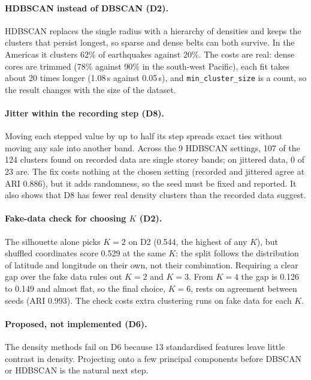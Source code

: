\paragraph{HDBSCAN instead of DBSCAN (D2).} HDBSCAN replaces the single radius with a hierarchy of
densities and keeps the clusters that persist longest, so sparse and dense belts can both survive. In the
Americas it clusters 62\% of earthquakes against 20\%. The costs are real: dense cores are trimmed (78\%
against 90\% in the south-west Pacific), each fit takes about 20 times longer (1.08\,s against 0.05\,s),
and \texttt{min\_cluster\_size} is a count, so the result changes with the size of the dataset.

\paragraph{Jitter within the recording step (D8).} Moving each stepped value by up to half its step
spreads exact ties without moving any sale into another band. Across the 9 HDBSCAN settings, 107 of the
124 clusters found on recorded data are single storey bands; on jittered data, 0 of 23 are. The fix costs
nothing at the chosen setting (recorded and jittered agree at ARI 0.886), but it adds randomness, so the
seed must be fixed and reported. It also shows that D8 has fewer real density clusters than the recorded
data suggest.

\paragraph{Fake-data check for choosing $K$ (D2).} The silhouette alone picks $K=2$ on D2 (0.544, the
highest of any $K$), but shuffled coordinates score 0.529 at the same $K$: the split follows the
distribution of latitude and longitude on their own, not their combination. Requiring a clear gap over the
fake data rules out $K=2$ and $K=3$. From $K=4$ the gap is 0.126 to 0.149 and almost flat, so the final
choice, $K=6$, rests on agreement between seeds (ARI 0.993). The check costs extra clustering runs on fake
data for each $K$.
\habegin
\paragraph{Proposed, not implemented (D6).} \hatag{} The density methods fail on D6 because 13
standardised features leave little contrast in density. Projecting onto a few principal components
before DBSCAN or HDBSCAN is the natural next step.
\haend

